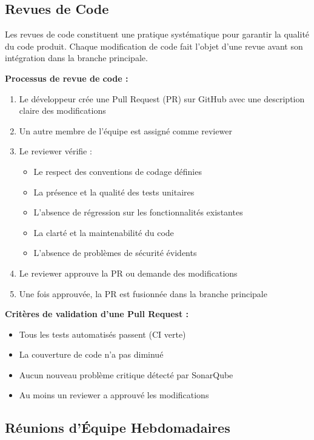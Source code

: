 \documentclass[12pt,a4paper]{report}
\begin{document}
\subsection{Revues de Code}

Les revues de code constituent une pratique systématique pour garantir la qualité du code produit. Chaque modification de code fait l'objet d'une revue avant son intégration dans la branche principale.

\textbf{Processus de revue de code :}

\begin{enumerate}
    \item Le développeur crée une Pull Request (PR) sur GitHub avec une description claire des modifications
    \item Un autre membre de l'équipe est assigné comme reviewer
    \item Le reviewer vérifie :
    \begin{itemize}
        \item Le respect des conventions de codage définies
        \item La présence et la qualité des tests unitaires
        \item L'absence de régression sur les fonctionnalités existantes
        \item La clarté et la maintenabilité du code
        \item L'absence de problèmes de sécurité évidents
    \end{itemize}
    \item Le reviewer approuve la PR ou demande des modifications
    \item Une fois approuvée, la PR est fusionnée dans la branche principale
\end{enumerate}

\textbf{Critères de validation d'une Pull Request :}
\begin{itemize}
    \item Tous les tests automatisés passent (CI verte)
    \item La couverture de code n'a pas diminué
    \item Aucun nouveau problème critique détecté par SonarQube
    \item Au moins un reviewer a approuvé les modifications
\end{itemize}

\subsection{Réunions d'Équipe Hebdomadaires}
\end{document}
